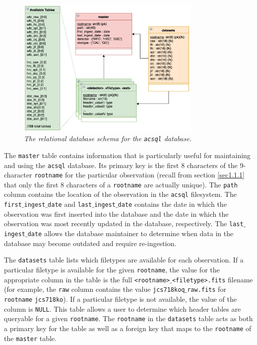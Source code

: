\documentclass[10pt,journal,compsoc]{IEEEtran}
\begin{document}
\begin{figure}[!h]
\centering
\includegraphics[width=3.5in]{./figures/schema.png}
\caption{\textit{The relational database schema for the \texttt{acsql} database.}
\label{fig11}}
\end{figure}

The \texttt{master} table contains information that is particularly useful for maintaining and using the \texttt{acsql} database.  Its primary key is the first 8 characters of the
9-character \texttt{rootname} for the particular observation (recall from section \ref{sec1.1.1} that only the first 8 characters of a \texttt{rootname} are actually unique).
The \texttt{path} column contains the location of the observation in the \texttt{acsql} filesystem.  The \texttt{first$\_$ingest$\_$date} and \texttt{last$\_$ingest$\_$date} contains
the date in which the observation was first inserted into the database and the date in which the observation was most recently updated in the database, respectively. The
\texttt{last$\_$ingest$\_$date} allows the database maintainer to determine when data in the database may become outdated and require re-ingestion.

The \texttt{datasets} table lists which filetypes are available for each observation.  If a particular filetype is available for the given \texttt{rootname}, the value for the
appropriate column in the table is the full \texttt{<rootname>$\_$<filetype>.fits} filename (for example, the \texttt{raw} column contains the value \texttt{jcs718koq$\_$raw.fits} for
\texttt{rootname} \texttt{jcs718ko}). If a particular filetype is not available, the value of the column is \texttt{NULL}. This table allows a user to determine which header tables are
queryable for a given \texttt{rootname}.  The \texttt{rootname} in the \texttt{datasets} table acts as both a primary key for the table as well as a foreign key that maps to the
\texttt{rootname} of the \texttt{master} table.
\end{document}
